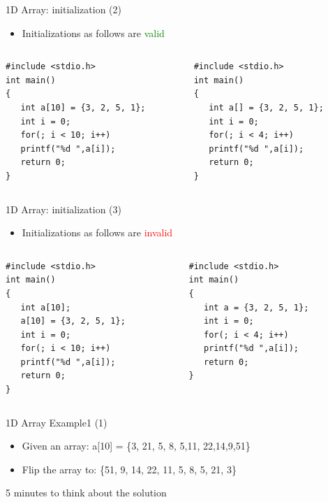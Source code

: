 \begin{frame}[fragile]{1D Array: initialization (2)}
\begin{itemize}
	\item {Initializations as follows are \textcolor{green}{valid}}
\end{itemize}
\begin{columns}
\begin{column}{0.45\linewidth}
\begin{lstlisting}
#include <stdio.h>
int main()
{
   int a[10] = {3, 2, 5, 1};
   int i = 0;
   for(; i < 10; i++)
   printf("%d ",a[i]);
   return 0;
}
\end{lstlisting}
\end{column}
\begin{column}{0.45\linewidth}
\begin{lstlisting}
#include <stdio.h>
int main()
{
   int a[] = {3, 2, 5, 1};
   int i = 0;
   for(; i < 4; i++)
   printf("%d ",a[i]);
   return 0;
}
\end{lstlisting}
\end{column}
\end{columns}
\end{frame}

\begin{frame}[fragile]{1D Array: initialization (3)}
\begin{itemize}
	\item {Initializations as follows are \textcolor{red}{invalid}}
\end{itemize}
\begin{columns}
\begin{column}{0.43\linewidth}
\begin{lstlisting}
#include <stdio.h>
int main()
{
   int a[10];
   a[10] = {3, 2, 5, 1};
   int i = 0;
   for(; i < 10; i++)
   printf("%d ",a[i]);
   return 0;
}
\end{lstlisting}
\end{column}
\begin{column}{0.43\linewidth}
\begin{lstlisting}
#include <stdio.h>
int main()
{
   int a = {3, 2, 5, 1};
   int i = 0;
   for(; i < 4; i++)
   printf("%d ",a[i]);
   return 0;
}
\end{lstlisting}
\end{column}
\end{columns}
\end{frame}

\begin{frame}{1D Array Example1 (1)}
	\begin{itemize}
		\item {Given an array: a[10] = \{3, 21, 5, 8, 5,11, 22,14,9,51\}}
		\item {Flip the array to: \{51, 9, 14, 22, 11, 5, 8, 5, 21, 3\}}
	\end{itemize}
	\vspace{0.2in}
	\begin{center}
		\Large{5 minutes to think about the solution}
	\end{center}
\end{frame}

